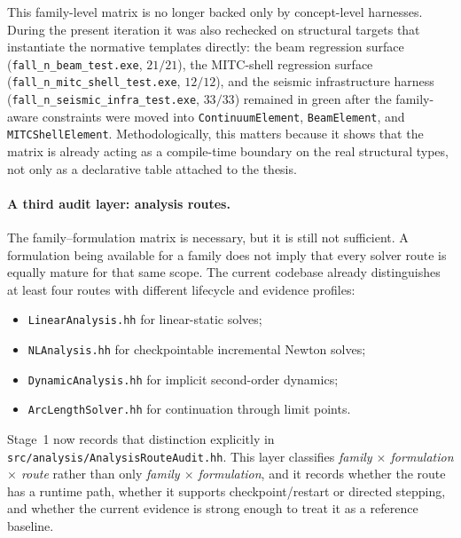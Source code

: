 This family-level matrix is no longer backed only by concept-level harnesses.
During the present iteration it was also rechecked on structural targets that
instantiate the normative templates directly: the beam regression surface
(\texttt{fall\_n\_beam\_test.exe}, \(21/21\)), the MITC-shell regression
surface (\texttt{fall\_n\_mitc\_shell\_test.exe}, \(12/12\)), and the seismic
infrastructure harness (\texttt{fall\_n\_seismic\_infra\_test.exe},
\(33/33\)) remained in green after the family-aware constraints were moved
into \texttt{ContinuumElement}, \texttt{BeamElement}, and
\texttt{MITCShellElement}.  Methodologically, this matters because it shows
that the matrix is already acting as a compile-time boundary on the real
structural types, not only as a declarative table attached to the thesis.

\paragraph{A third audit layer: analysis routes.}
The family--formulation matrix is necessary, but it is still not sufficient.
A formulation being available for a family does not imply that every solver
route is equally mature for that same scope.  The current codebase already
distinguishes at least four routes with different lifecycle and evidence
profiles:
\begin{itemize}
  \item \texttt{LinearAnalysis.hh} for linear-static solves;
  \item \texttt{NLAnalysis.hh} for checkpointable incremental Newton solves;
  \item \texttt{DynamicAnalysis.hh} for implicit second-order dynamics;
  \item \texttt{ArcLengthSolver.hh} for continuation through limit points.
\end{itemize}

Stage~1 now records that distinction explicitly in
\texttt{src/analysis/AnalysisRouteAudit.hh}.  This layer classifies
\emph{family \(\times\) formulation \(\times\) route} rather than only
\emph{family \(\times\) formulation}, and it records whether the route has a
runtime path, whether it supports checkpoint/restart or directed stepping, and
whether the current evidence is strong enough to treat it as a reference
baseline.

